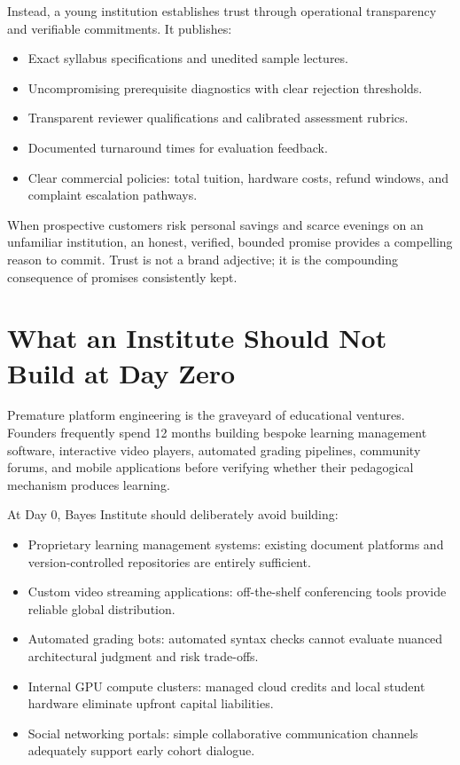 Instead, a young institution establishes trust through operational transparency and verifiable commitments. It publishes:
\begin{itemize}[leftmargin=*]
\item Exact syllabus specifications and unedited sample lectures.
\item Uncompromising prerequisite diagnostics with clear rejection thresholds.
\item Transparent reviewer qualifications and calibrated assessment rubrics.
\item Documented turnaround times for evaluation feedback.
\item Clear commercial policies: total tuition, hardware costs, refund windows, and complaint escalation pathways.
\end{itemize}

When prospective customers risk personal savings and scarce evenings on an unfamiliar institution, an honest, verified, bounded promise provides a compelling reason to commit. Trust is not a brand adjective; it is the compounding consequence of promises consistently kept.

\section{What an Institute Should Not Build at Day Zero}

Premature platform engineering is the graveyard of educational ventures. Founders frequently spend 12 months building bespoke learning management software, interactive video players, automated grading pipelines, community forums, and mobile applications before verifying whether their pedagogical mechanism produces learning.

At Day 0, Bayes Institute should deliberately avoid building:
\begin{itemize}[leftmargin=*]
\item Proprietary learning management systems: existing document platforms and version-controlled repositories are entirely sufficient.
\item Custom video streaming applications: off-the-shelf conferencing tools provide reliable global distribution.
\item Automated grading bots: automated syntax checks cannot evaluate nuanced architectural judgment and risk trade-offs.
\item Internal GPU compute clusters: managed cloud credits and local student hardware eliminate upfront capital liabilities.
\item Social networking portals: simple collaborative communication channels adequately support early cohort dialogue.
\end{itemize}

